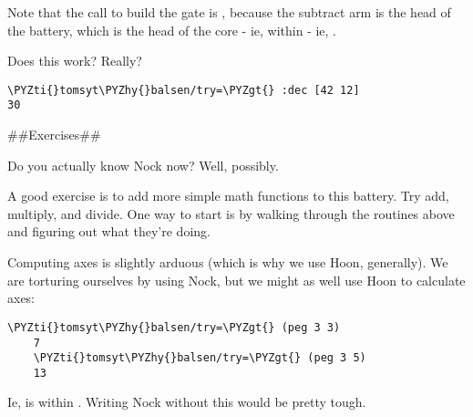 Note that the call to build the gate is \kode{[9 4 0 2]}, because the
subtract arm is the head of the battery, which is the head of the
core - ie,  within  - ie, .

Does this work?  Really?

\begin{framed_shaded}
\begin{Verbatim}[fontsize=\relsize{-2.5},commandchars=\\\{\}]
\PYZti{}tomsyt\PYZhy{}balsen/try=\PYZgt{} :dec [42 12]
30
\end{Verbatim}
\end{framed_shaded}
\#\#Exercises\#\#

Do you actually know Nock now?  Well, possibly.

A good exercise is to add more simple math functions to this
battery.  Try add, multiply, and divide.  One way to start is by
walking through the routines above and figuring out what they're doing.

Computing axes is slightly arduous (which is why we use Hoon,
generally).  We are torturing ourselves by using Nock, but we
might as well use Hoon to calculate axes:

\begin{framed_shaded}
\begin{Verbatim}[fontsize=\relsize{-2.5},commandchars=\\\{\}]
    \PYZti{}tomsyt\PYZhy{}balsen/try=\PYZgt{} (peg 3 3)
    7
    \PYZti{}tomsyt\PYZhy{}balsen/try=\PYZgt{} (peg 3 5)
    13
\end{Verbatim}
\end{framed_shaded}
Ie,  is  within .  Writing Nock without this
would be pretty tough.